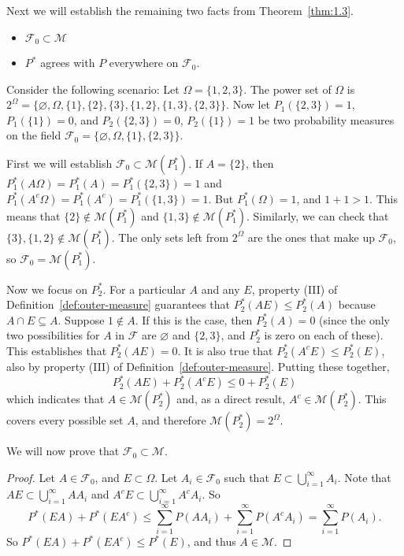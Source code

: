 \documentclass[11pt,fleqn]{book} %
\begin{document}
Next we will establish the remaining two facts from Theorem~\ref{thm:1.3}.
\begin{itemize}
	\item $\mathcal{F}_0 \subset \mathcal{M}$
	\item $P^*$ agrees with $P$ everywhere on $\mathcal{F}_0$.
\end{itemize}

\begin{example}[Exercise 3.3(a)]
	Consider the following scenario: Let $\Omega = \{1,2,3\}$. The power set of $\Omega$ is $2^\Omega = \{\varnothing,\Omega,\{1\},\{2\},\{3\},\{1,2\},\{1,3\},\{2,3\}\}$. Now let $P_1(\{2,3\}) = 1$, $P_1(\{1\})=0$, and $P_2(\{2,3\})=0$, $P_2(\{1\})=1$ be two probability measures on the field $\mathcal{F}_0 = \{\varnothing,\Omega,\{1\},\{2,3\}\}$.

	First we will establish $\mathcal{F_0} \subset \mathcal{M}(P_1^*)$.
	If $A = \{2\}$, then $P_1^*(A\Omega) = P_1^*(A) = P_1^*(\{2,3\}) = 1$ and $P_1^*(A^c\Omega) = P_1^*(A^c) = P_1^*(\{1,3\}) = 1$. But $P_1^*(\Omega) = 1$, and $1+1 > 1$. This means that $\{2\} \notin \mathcal{M}(P_1^*)$ and $\{1,3\} \notin \mathcal{M}(P_1^*)$. Similarly, we can check that $\{3\}, \{1,2\} \notin \mathcal{M}(P_1^*)$. The only sets left from $2^\Omega$ are the ones that make up $\mathcal{F}_0$, so $\mathcal{F}_0 = \mathcal{M}(P_1^*)$.

	Now we focus on $P_2^*$. For a particular $A$ and any $E$, property (III) of Definition~\ref{def:outer-measure} guarantees that $P_2^*(AE) \leq P_2^*(A)$ because $A \cap E \subseteq A$. Suppose $1 \notin A$. If this is the case, then $P_2^*(A) = 0$ (since the only two possibilities for $A$ in $\mathcal{F}$ are $\varnothing$ and $\{2,3\}$, and $P_2^*$ is zero on each of these). This establishes that $P_2^*(AE) = 0$. It is also true that $P_2^*(A^cE) \leq P_2^*(E)$, also by property (III) of Definition~\ref{def:outer-measure}. Putting these together,
	\[
		P_2^*(AE) + P_2^*(A^cE) \leq 0 + P_2^*(E)
	\]
	which indicates that $A \in \mathcal{M}(P_2^*)$ and, as a direct result, $A^c \in \mathcal{M}(P_2^*)$. This covers every possible set $A$, and therefore $\mathcal{M}(P_2^*) = 2^\Omega$.
\end{example}

We will now prove that $\mathcal{F}_0 \subset \mathcal{M}$.

\begin{proof}
	Let $A \in \mathcal{F}_0$, and $E \subset \Omega$. Let $A_i \in \mathcal{F}_0$ such that $E \subset \bigcup_{i=1}^\infty A_i$. Note that $AE \subset \bigcup_{i=1}^\infty AA_i$ and $A^cE \subset \bigcup_{i=1}^\infty A^cA_i$. So
	\[
		P^*(EA) + P^*(EA^c) \leq \sum_{i=1}^\infty P(AA_i) + \sum_{i=1}^\infty P(A^cA_i) = \sum_{i=1}^\infty P(A_i).
	\]
	So $P^*(EA) + P^*(EA^c) \leq P^*(E)$, and thus $A \in \mathcal{M}$.
\end{proof}
\end{document}
